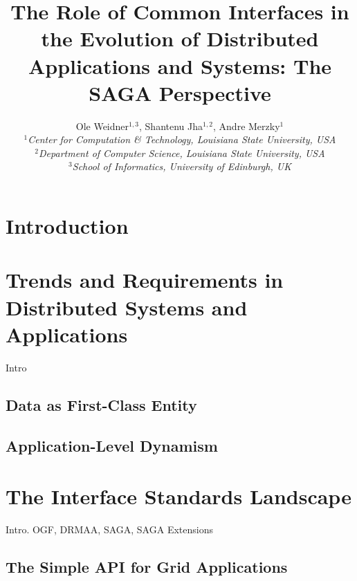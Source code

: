 \documentclass[a4paper,10pt]{article}
\begin{document}
 \title{ \large \vspace{-3.5em} The Role of Common Interfaces in the Evolution of Distributed Applications and Systems: The SAGA Perspective}


 \author{\normalsize Ole Weidner$^{1,3}$, Shantenu Jha$^{1,2}$, Andre Merzky$^{1}$\\
   \small{\emph{$^{1}$Center for Computation \& Technology, Louisiana State University, USA}}\\
   \small{\emph{$^{2}$Department of Computer Science, Louisiana State University, USA}}\\
   \small{\emph{$^{3}$School of Informatics, University of Edinburgh, UK}}
 }
 \date{}
 \maketitle

 
\section{Introduction}
\label{intro}

\section{Trends and Requirements in Distributed Systems and Applications}

Intro

\subsection{Data as First-Class Entity}

\subsection{Application-Level Dynamism}

\section{The Interface Standards Landscape}
\label{interface_landscape}

Intro. OGF, DRMAA, SAGA, SAGA Extensions

\subsection{The Simple API for Grid Applications}
\end{document}
